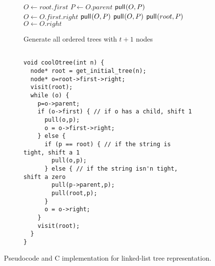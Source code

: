 \begin{figure}
    \centering
    \begin{subfigure}[t]{.49 \textwidth}
	\begin{center}
	    \begin{algorithm}[H] %
	    \begin{algorithmic}
	\State $O\gets root.first$
	\State {}
	    \State $P \gets O.parent$
		\State $\mathsf{pull}_{}(O,P)$
		\State $O \gets O.first.right$
	    \Else
		\State $\mathsf{pull}_{}(O,P)$
		\Else
		\State $\mathsf{pull}_{}(O,P)$
		\State $\mathsf{pull}_{}(root,P)$
		\EndIf
		\State $O \gets O.right$
	    \EndIf
	\State {}
        \EndWhile
    \EndFunction
	    \end{algorithmic}
    \caption*{Generate all ordered trees with $t+1$ nodes}
	\end{algorithm}
	\end{center}
	\label{fig:}
    \end{subfigure}
    \begin{subfigure}[t]{.5 \textwidth}
	\begin{center}
	    \vspace{.9em} %
\begin{Verbatim}[commandchars=\\\[\]]

void coolOtree(int n) {
  node* root = get_initial_tree(n);
  node* o=root->first->right;
  visit(root);
  while (o) {
    p=o->parent;
    if (o->first) { // if o has a child, shift 1
      pull(o,p);
      o = o->first->right;
    } else {
      if (p == root) { // if the string is tight, shift a 1
        pull(o,p);
      } else { // if the string isn'n tight, shift a zero
        pull(p->parent,p);
        pull(root,p);
      }
      o = o->right;
    }
    visit(root);
  }
}

\end{Verbatim}
	\end{center}
	\label{fig:}
    \end{subfigure}
    \cprotect\caption{Pseudocode and C implementation for linked-list tree representation.}
    \label{fig:otreeCode}
\end{figure}


